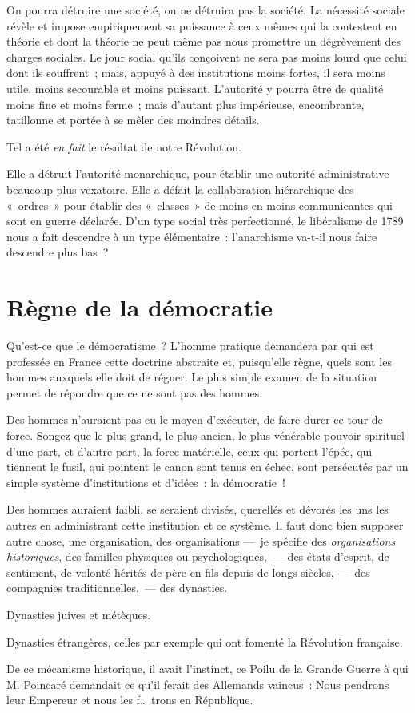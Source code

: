 \documentclass[french,twoside]{book} %
\newcommand{\astermono}{\medskip\centerline{\color{rubric}\large\selectfont{\syms ✻}}\medskip\par}%
\begin{document}
\astermono

\noindent On pourra détruire une société, on ne détruira pas la société. La nécessité sociale révèle et impose empiriquement sa puissance à ceux mêmes qui la contestent en théorie et dont la théorie ne peut même pas nous promettre un dégrèvement des charges sociales. Le jour social qu’ils conçoivent ne sera pas moins lourd que celui dont ils souffrent ; mais, appuyé à des institutions moins fortes, il sera moins utile, moins secourable et moins puissant. L’autorité y pourra être de qualité moins fine et moins ferme ; mais d’autant plus impérieuse, encombrante, tatillonne et portée à se mêler des moindres détails.\par
Tel a été \emph{en fait} le résultat de notre Révolution.\par
Elle a détruit l’autorité monarchique, pour établir une autorité administrative beaucoup plus vexatoire. Elle a défait la collaboration hiérarchique des « ordres » pour établir des « classes » de moins en moins communicantes qui sont en guerre déclarée. D’un type social très perfectionné, le libéralisme de 1789 nous a fait descendre à un type élémentaire : l’anarchisme va-t-il nous faire descendre plus bas ?
\section[Règne de la démocratie]{Règne de la démocratie}
\noindent Qu’est-ce que le démocratisme ? L’homme pratique demandera par qui est professée en France cette doctrine abstraite et, puisqu’elle règne, quels sont les hommes auxquels elle doit de régner. Le plus simple examen de la situation permet de répondre que ce ne sont pas des hommes.\par
Des hommes n’auraient pas eu le moyen d’exécuter, de faire durer ce tour de force. Songez que le plus grand, le plus ancien, le plus vénérable pouvoir spirituel d’une part, et d’autre part, la force matérielle, ceux qui portent l’épée, qui tiennent le fusil, qui pointent le canon sont tenus en échec, sont persécutés par un simple système d’institutions et d’idées : la démocratie !\par
Des hommes auraient faibli, se seraient divisés, querellés et dévorés les uns les autres en administrant cette institution et ce système. Il faut donc bien supposer autre chose, une organisation, des organisations — je spécifie des \emph{organisations historiques}, des familles physiques ou psychologiques, — des états d’esprit, de sentiment, de volonté hérités de père en fils depuis de longs siècles, — des compagnies traditionnelles, — des dynasties.\par
Dynasties juives et métèques.\par
Dynasties étrangères, celles par exemple qui ont fomenté la Révolution française.\par
De ce mécanisme historique, il avait l’instinct, ce Poilu de la Grande Guerre à qui M. Poincaré demandait ce qu’il ferait des Allemands vaincus : Nous pendrons leur Empereur et nous les f… trons en République.\par
\end{document}

